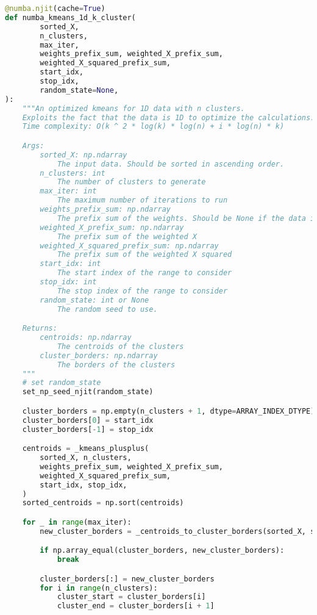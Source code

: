 \begin{lstlisting}[language=Python]
@numba.njit(cache=True)
def numba_kmeans_1d_k_cluster(
        sorted_X,
        n_clusters,
        max_iter,
        weights_prefix_sum, weighted_X_prefix_sum,
        weighted_X_squared_prefix_sum,
        start_idx,
        stop_idx,
        random_state=None,
):
    """An optimized kmeans for 1D data with n clusters.
    Exploits the fact that the data is 1D to optimize the calculations.
    Time complexity: O(k ^ 2 * log(k) * log(n) + i * log(n) * k)

    Args:
        sorted_X: np.ndarray
            The input data. Should be sorted in ascending order.
        n_clusters: int
            The number of clusters to generate
        max_iter: int
            The maximum number of iterations to run
        weights_prefix_sum: np.ndarray
            The prefix sum of the weights. Should be None if the data is unweighted.
        weighted_X_prefix_sum: np.ndarray
            The prefix sum of the weighted X
        weighted_X_squared_prefix_sum: np.ndarray
            The prefix sum of the weighted X squared
        start_idx: int
            The start index of the range to consider
        stop_idx: int
            The stop index of the range to consider
        random_state: int or None
            The random seed to use.

    Returns:
        centroids: np.ndarray
            The centroids of the clusters
        cluster_borders: np.ndarray
            The borders of the clusters
    """
    # set random_state
    set_np_seed_njit(random_state)

    cluster_borders = np.empty(n_clusters + 1, dtype=ARRAY_INDEX_DTYPE)
    cluster_borders[0] = start_idx
    cluster_borders[-1] = stop_idx

    centroids = _kmeans_plusplus(
        sorted_X, n_clusters,
        weights_prefix_sum, weighted_X_prefix_sum,
        weighted_X_squared_prefix_sum,
        start_idx, stop_idx,
    )
    sorted_centroids = np.sort(centroids)

    for _ in range(max_iter):
        new_cluster_borders = _centroids_to_cluster_borders(sorted_X, sorted_centroids, start_idx, stop_idx)

        if np.array_equal(cluster_borders, new_cluster_borders):
            break

        cluster_borders[:] = new_cluster_borders
        for i in range(n_clusters):
            cluster_start = cluster_borders[i]
            cluster_end = cluster_borders[i + 1]


\end{lstlisting}

